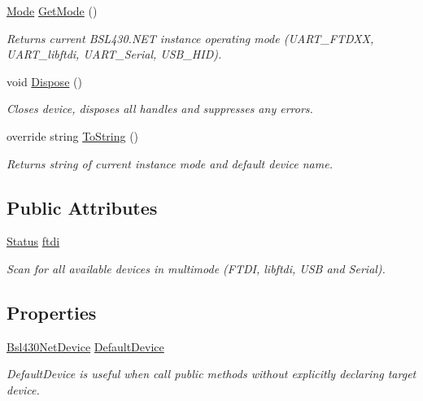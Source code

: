 \begin{DoxyCompactItemize}
\mbox{\hyperlink{namespace_b_s_l430___n_e_t_aa1c6981cb6f279b5491d861ca555a1d7}{Mode}} \mbox{\hyperlink{class_b_s_l430___n_e_t_1_1_b_s_l430_n_e_t_af98024781d260383a8b869a6338cbeb9}{Get\+Mode}} ()
\begin{DoxyCompactList}\small\item\em Returns current B\+S\+L430.\+N\+ET instance operating mode (U\+A\+R\+T\+\_\+\+F\+T\+D\+XX, U\+A\+R\+T\+\_\+libftdi, U\+A\+R\+T\+\_\+\+Serial, U\+S\+B\+\_\+\+H\+ID). \end{DoxyCompactList}\item 
void \mbox{\hyperlink{class_b_s_l430___n_e_t_1_1_b_s_l430_n_e_t_a3e21b80cdbe759cbc45ffa7bd6d7406e}{Dispose}} ()
\begin{DoxyCompactList}\small\item\em Closes device, disposes all handles and suppresses any errors. \end{DoxyCompactList}\item 
override string \mbox{\hyperlink{class_b_s_l430___n_e_t_1_1_b_s_l430_n_e_t_ace5a0f8f3d3eb9b26279ae557ffa9505}{To\+String}} ()
\begin{DoxyCompactList}\small\item\em Returns string of current instance mode and default device name. \end{DoxyCompactList}\end{DoxyCompactItemize}
\subsection*{Public Attributes}
\begin{DoxyCompactItemize}
\item 
\mbox{\hyperlink{class_b_s_l430___n_e_t_1_1_status}{Status}} \mbox{\hyperlink{class_b_s_l430___n_e_t_1_1_b_s_l430_n_e_t_a991fc7208aa2b44a860db8a69db11f35}{ftdi}}
\begin{DoxyCompactList}\small\item\em Scan for all available devices in multimode (F\+T\+DI, libftdi, U\+SB and Serial). \end{DoxyCompactList}\end{DoxyCompactItemize}
\subsection*{Properties}
\begin{DoxyCompactItemize}
\item 
\mbox{\hyperlink{class_b_s_l430___n_e_t_1_1_bsl430_net_device}{Bsl430\+Net\+Device}} \mbox{\hyperlink{class_b_s_l430___n_e_t_1_1_b_s_l430_n_e_t_a42cd02015803b28be0cf56880404ea07}{Default\+Device}}
\begin{DoxyCompactList}\small\item\em Default\+Device is useful when call public methods without explicitly declaring target device. \end{DoxyCompactList}\end{DoxyCompactItemize}
